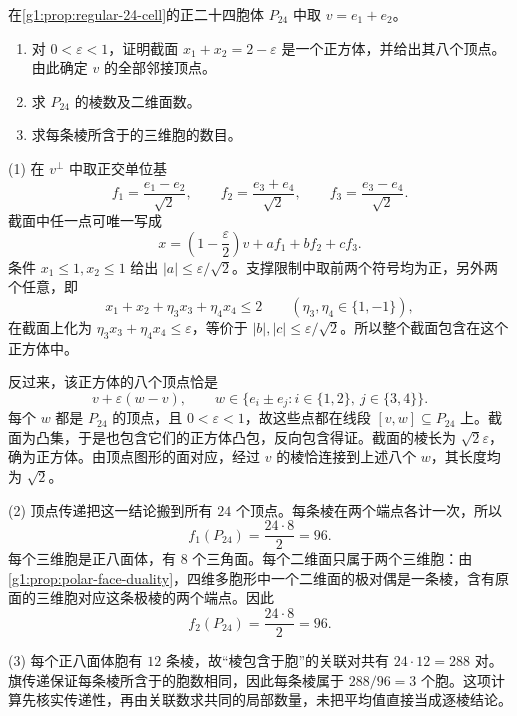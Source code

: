 \begin{exercise}
	\label{g1:ex:24-cell-vertex-figure}
	在\cref{g1:prop:regular-24-cell}的正二十四胞体 \(P_{24}\) 中取 \(v=e_1+e_2\)。
	\begin{enumerate}
		\item 对 \(0<\varepsilon<1\)，证明截面 \(x_1+x_2=2-\varepsilon\) 是一个正方体，并给出其八个顶点。由此确定 \(v\) 的全部邻接顶点。
		\item 求 \(P_{24}\) 的棱数及二维面数。
		\item 求每条棱所含于的三维胞的数目。
	\end{enumerate}
\end{exercise}
\begin{solution}
	(1) 在 \(v^\perp\) 中取正交单位基
	\[
		f_1=\frac{e_1-e_2}{\sqrt2},\qquad
		f_2=\frac{e_3+e_4}{\sqrt2},\qquad
		f_3=\frac{e_3-e_4}{\sqrt2}.
	\]
	截面中任一点可唯一写成
	\[
		x=\left(1-\frac\varepsilon2\right)v+af_1+bf_2+cf_3.
	\]
	条件 \(x_1\le1,x_2\le1\) 给出 \(|a|\le\varepsilon/\sqrt2\)。支撑限制中取前两个符号均为正，另外两个任意，即
	\[
		x_1+x_2+\eta_3x_3+\eta_4x_4\le2
		\qquad(\eta_3,\eta_4\in\{1,-1\}),
	\]
	在截面上化为 \(\eta_3x_3+\eta_4x_4\le\varepsilon\)，等价于 \(|b|,|c|\le\varepsilon/\sqrt2\)。所以整个截面包含在这个正方体中。

	反过来，该正方体的八个顶点恰是
	\[
		v+\varepsilon(w-v),\qquad
		w\in\{e_i\pm e_j:i\in\{1,2\},\ j\in\{3,4\}\}.
	\]
	每个 \(w\) 都是 \(P_{24}\) 的顶点，且 \(0<\varepsilon<1\)，故这些点都在线段 \([v,w]\subseteq P_{24}\) 上。截面为凸集，于是也包含它们的正方体凸包，反向包含得证。截面的棱长为 \(\sqrt2\varepsilon\)，确为正方体。由顶点图形的面对应，经过 \(v\) 的棱恰连接到上述八个 \(w\)，其长度均为 \(\sqrt2\)。

	(2) 顶点传递把这一结论搬到所有 \(24\) 个顶点。每条棱在两个端点各计一次，所以
	\[
		f_1(P_{24})=\frac{24\cdot8}{2}=96.
	\]
	每个三维胞是正八面体，有 \(8\) 个三角面。每个二维面只属于两个三维胞：由\cref{g1:prop:polar-face-duality}，四维多胞形中一个二维面的极对偶是一条棱，含有原面的三维胞对应这条极棱的两个端点。因此
	\[
		f_2(P_{24})=\frac{24\cdot8}{2}=96.
	\]

	(3) 每个正八面体胞有 \(12\) 条棱，故“棱包含于胞”的关联对共有 \(24\cdot12=288\) 对。旗传递保证每条棱所含于的胞数相同，因此每条棱属于 \(288/96=3\) 个胞。这项计算先核实传递性，再由关联数求共同的局部数量，未把平均值直接当成逐棱结论。
\end{solution}

